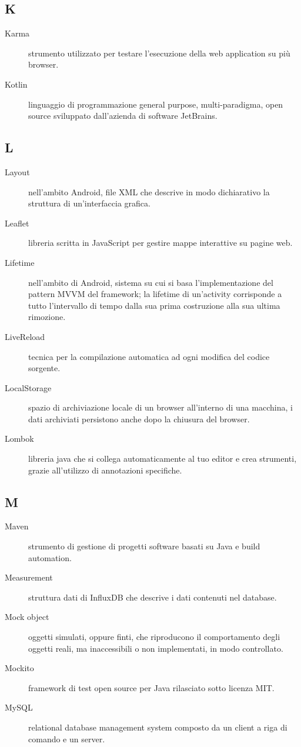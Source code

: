 \documentclass[../manuale-manutentore.tex]{subfiles}
\begin{document}
\subsection{K}

\begin{description}
    \item[Karma] strumento utilizzato per testare l'esecuzione della web application su più browser.
    \item[Kotlin] linguaggio di programmazione general purpose, multi-paradigma, open source sviluppato dall'azienda di software JetBrains.
\end{description}

\subsection{L}

\begin{description}
    \item[Layout] nell'ambito Android, file XML che descrive in modo dichiarativo la struttura di un'interfaccia grafica.
    \item[Leaflet] libreria scritta in JavaScript per gestire mappe interattive su pagine web.
    \item[Lifetime] nell'ambito di Android, sistema su cui si basa l'implementazione del pattern MVVM del framework; la lifetime di un'activity corrisponde a tutto l'intervallo di tempo dalla sua prima costruzione alla sua ultima rimozione.
    \item[LiveReload] tecnica per la compilazione automatica ad ogni modifica del codice sorgente.
    \item[LocalStorage] spazio di archiviazione locale di un browser all'interno di una macchina, i dati archiviati persistono anche dopo la chiusura del browser.
    \item[Lombok] libreria java che si collega automaticamente al tuo editor e crea strumenti, grazie all'utilizzo di annotazioni specifiche.
\end{description}

\subsection{M}

\begin{description}
    \item[Maven] strumento di gestione di progetti software basati su Java e build automation.
    \item[Measurement] struttura dati di InfluxDB che descrive i dati contenuti nel database.
    \item[Mock object] oggetti simulati, oppure finti, che riproducono il comportamento degli oggetti reali, ma inaccessibili o non implementati, in modo controllato.
    \item[Mockito] framework di test open source per Java rilasciato sotto licenza MIT\@.
    \item[MySQL] relational database management system composto da un client a riga di comando e un server.
\end{description}
\end{document}

